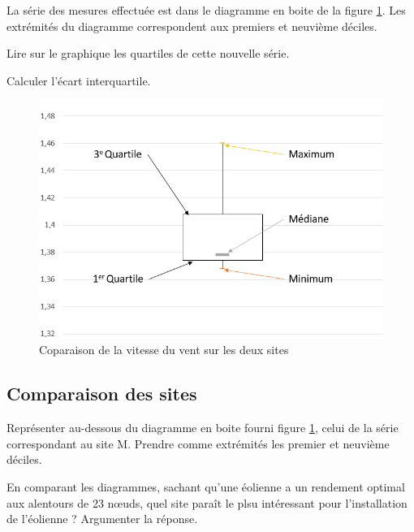 La série des mesures effectuée est dans le diagramme en boite de la figure \ref{fig:comparaison}. Les extrémités du diagramme correspondent aux premiers et neuvième déciles.

\begin{questions}
	
	\question Lire sur le graphique les quartiles de cette nouvelle série.
	
	\question Calculer l'écart interquartile.
\end{questions}

\begin{figure}[b]
	\begin{center}
		\includegraphics[scale=0.5]{../moustache}
	\end{center}
	\caption{Coparaison de la vitesse du vent sur les deux sites}
	\label{fig:comparaison}
\end{figure}

\subsection{Comparaison des sites}\label{part:comp}

\begin{questions}
	\question Représenter au-dessous du diagramme en boite fourni figure \ref{fig:comparaison}, celui de la série correspondant au site M. Prendre comme extrémités les premier et neuvième déciles.
	
	\question En comparant les diagrammes, sachant qu'une éolienne a un rendement optimal aux alentours de 23 n\oe uds, quel site paraît le plsu intéressant pour l'installation de l'éolienne ? Argumenter la réponse. 
\end{questions}